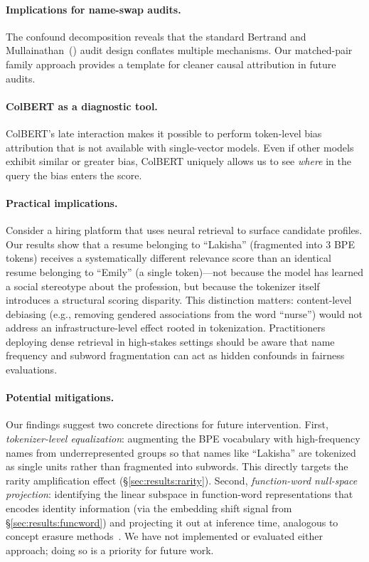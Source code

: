 \documentclass[11pt]{article}
\begin{document}
\paragraph{Implications for name-swap audits.}
The confound decomposition reveals that the standard Bertrand and Mullainathan~(\citeyear{bertrand2004}) audit design conflates multiple mechanisms. Our matched-pair family approach provides a template for cleaner causal attribution in future audits.

\paragraph{ColBERT as a diagnostic tool.}
ColBERT's late interaction makes it possible to perform token-level bias attribution that is not available with single-vector models. Even if other models exhibit similar or greater bias, ColBERT uniquely allows us to see \emph{where} in the query the bias enters the score.

\paragraph{Practical implications.}
Consider a hiring platform that uses neural retrieval to surface candidate profiles. Our results show that a resume belonging to ``Lakisha'' (fragmented into 3 BPE tokens) receives a systematically different relevance score than an identical resume belonging to ``Emily'' (a single token)---not because the model has learned a social stereotype about the profession, but because the tokenizer itself introduces a structural scoring disparity. This distinction matters: content-level debiasing (e.g., removing gendered associations from the word ``nurse'') would not address an infrastructure-level effect rooted in tokenization. Practitioners deploying dense retrieval in high-stakes settings should be aware that name frequency and subword fragmentation can act as hidden confounds in fairness evaluations.

\paragraph{Potential mitigations.}
Our findings suggest two concrete directions for future intervention. First, \emph{tokenizer-level equalization}: augmenting the BPE vocabulary with high-frequency names from underrepresented groups so that names like ``Lakisha'' are tokenized as single units rather than fragmented into subwords. This directly targets the rarity amplification effect (\S\ref{sec:results:rarity}). Second, \emph{function-word null-space projection}: identifying the linear subspace in function-word representations that encodes identity information (via the embedding shift signal from \S\ref{sec:results:funcword}) and projecting it out at inference time, analogous to concept erasure methods~\citep{ravfogel2020}. We have not implemented or evaluated either approach; doing so is a priority for future work.
\end{document}
